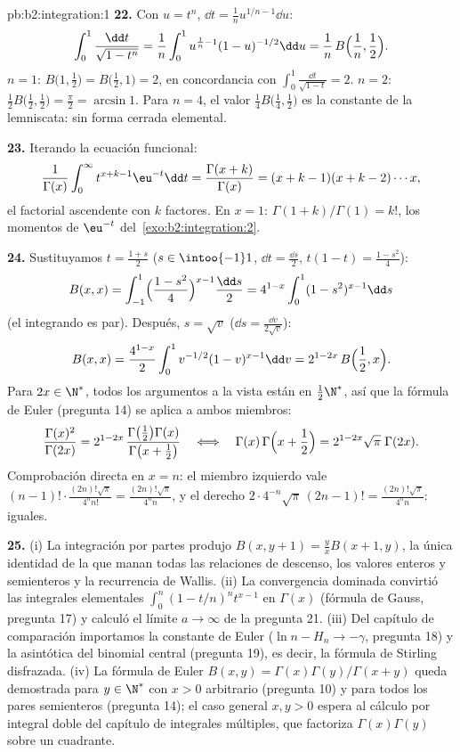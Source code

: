 \begin{solution}{pb:b2:integration:1}
\textbf{22.} Con $u = t^n$, $\dd t = \frac1n u^{1/n - 1}\dd u$:
\[
\int_0^1 \frac{\dd t}{\sqrt{1-t^n}}
= \frac1n\int_0^1 u^{\frac1n-1}(1-u)^{-1/2}\dd u
= \frac1n\,B\Bigl(\frac1n, \frac12\Bigr) .
\]
$n = 1$: $B\bigl(1,\frac12\bigr) = B\bigl(\frac12,1\bigr) = 2$, en
concordancia con $\int_0^1\frac{\dd t}{\sqrt{1-t}} = 2$. $n = 2$:
$\frac12 B\bigl(\frac12,\frac12\bigr) = \frac\pi2 = \arcsin 1$.
Para $n = 4$, el valor $\frac14 B\bigl(\frac14,\frac12\bigr)$ es la
constante de la lemniscata: sin forma cerrada elemental.

\textbf{23.} Iterando la ecuación funcional:
\[
\frac{1}{\Gamma(x)}\int_0^\infty t^{x+k-1}\eu^{-t}\dd t
= \frac{\Gamma(x+k)}{\Gamma(x)}
= (x+k-1)(x+k-2)\cdots x ,
\]
el factorial ascendente con $k$ factores. En $x = 1$:
$\Gamma(1+k)/\Gamma(1) = k!$, los momentos de $\eu^{-t}$ del~\cref{exo:b2:integration:2}.

\textbf{24.} Sustituyamos $t = \frac{1+s}2$ ($s \in \intoo{-1}1$,
$\dd t = \frac{\dd s}2$, $t(1-t) = \frac{1-s^2}4$):
\[
B(x,x) = \int_{-1}^{1}\Bigl(\frac{1-s^2}{4}\Bigr)^{x-1}
\frac{\dd s}{2}
= 4^{1-x}\int_0^1 (1-s^2)^{x-1}\dd s
\]
(el integrando es par). Después, $s = \sqrt v$ ($\dd s = \frac{\dd
v}{2\sqrt v}$):
\[
B(x,x) = \frac{4^{1-x}}{2}\int_0^1
v^{-1/2}(1-v)^{x-1}\dd v
= 2^{1-2x}\,B\Bigl(\frac12, x\Bigr) .
\]
Para $2x \in \N^*$, todos los argumentos a la vista están en
$\frac12\N^*$, así que la fórmula de Euler (pregunta 14) se aplica
a ambos miembros:
\[
\frac{\Gamma(x)^2}{\Gamma(2x)}
= 2^{1-2x}\,
\frac{\Gamma\bigl(\frac12\bigr)\Gamma(x)}
{\Gamma\bigl(x+\frac12\bigr)}
\quad\Longleftrightarrow\quad
\Gamma(x)\,\Gamma\Bigl(x+\frac12\Bigr)
= 2^{1-2x}\sqrt\pi\;\Gamma(2x) .
\]
Comprobación directa en $x = n$: el miembro izquierdo vale
$(n-1)!\cdot \frac{(2n)!\sqrt\pi}{4^n n!} = \frac{(2n)!\sqrt\pi}{4^n
n}$, y el derecho $2\cdot4^{-n}\sqrt\pi\,(2n-1)! =
\frac{(2n)!\sqrt\pi}{4^n n}$: iguales.

\textbf{25.} (i) La integración por partes produjo $B(x,y+1) =
\frac yx B(x+1,y)$, la única identidad de la que manan todas las
relaciones de descenso, los valores enteros y semienteros y la
recurrencia de Wallis. (ii) La convergencia dominada convirtió las
integrales elementales $\int_0^n(1-t/n)^n t^{x-1}$ en $\Gamma(x)$
(fórmula de Gauss, pregunta 17) y calculó el límite $a \to \infty$
de la pregunta 21. (iii) Del capítulo de comparación importamos la
constante de Euler ($\ln n - H_n \to -\gamma$, pregunta 18) y la
asintótica del binomial central (pregunta 19), es decir, la fórmula
de Stirling disfrazada. (iv) La fórmula de Euler $B(x,y) =
\Gamma(x)\Gamma(y)/\Gamma(x+y)$ queda demostrada para $y \in \N^*$
con $x > 0$ arbitrario (pregunta 10) y para todos los pares
semienteros (pregunta 14); el caso general $x, y > 0$ espera al
cálculo por integral doble del capítulo de integrales múltiples,
que factoriza $\Gamma(x)\Gamma(y)$ sobre un cuadrante.
\end{solution}
